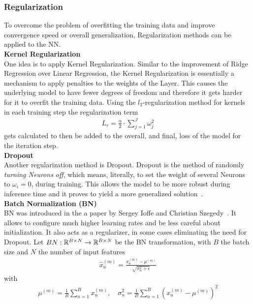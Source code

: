 \subsubsection{Regularization}
To overcome the problem of overfitting the training data and improve convergence speed or overall generalization, Regularization methods can be applied to the NN.\\
\textbf{Kernel Regularization}\\
One idea is to apply Kernel Regularization.
Similar to the improvement of Ridge Regression over Linear Regression, the Kernel Regularization is essentially a mechanism to apply penalties to the weights of the Layer.
This causes the underlying model to have fewer degrees of freedom and therefore it gets harder for it to overfit the training data.
Using the $l_2$-regularization method for kernels in each training step the regularization term
\begin{align}
    L_r = \frac{\alpha}{2} \cdot \sum \limits_{j=1}^J \omega_j^2
\end{align}
gets calculated to then be added to the overall, and final, loss of the model for the iteration step.\\
\textbf{Dropout}\\
Another regularization method is Dropout.
Dropout is the method of randomly \textit{turning Neurons off}, which means, literally, to set the weight of several Neurons to $\omega_i = 0$, during training. This allows the model to be more robust during inference time and it proves to yield a more generalized solution~\cite{JMLR:v15:srivastava14a}.\\
\textbf{Batch Normalization (BN)}\\
BN was introduced in the a paper by Sergey Ioffe and Christian Szegedy~\cite{batch-normalization}.
It allows to configure much higher learning rates and be less careful about initialization.
It also acts as a regularizer, in some cases eliminating the need for Dropout.
Let $BN: \mathbb{R}^{B\times N} \rightarrow \mathbb{R}^{B \times N}$ be the BN transformation, with $B$ the batch size and $N$ the number of input features
\begin{align}
    \hat{x}_n^{(m)} = \frac{x_n^{(m)}-\mu^{(m)}}{\sqrt{\sigma_n^2 + \epsilon}}
    \label{eq:bn}
\end{align}
with
\begin{align}
    \mu^{(m)} = \frac{1}{B}\sum \limits_{n=1}^B x^{(m)}_n,
    \quad
    \sigma_n^2 = \frac{1}{B}\sum \limits_{n=1}^B\left(x^{(m)}_n-\mu^{(m)}\right)^2
\end{align}
